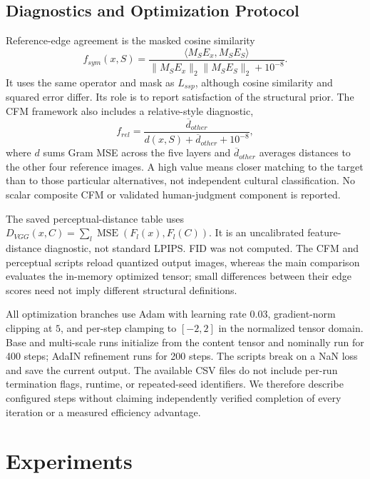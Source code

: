 \documentclass[manuscript,acmlarge,screen,review]{acmart}
\begin{document}
\subsection{Diagnostics and Optimization Protocol}
Reference-edge agreement is the masked cosine similarity
\begin{equation}
f_{sym}(x,S)=\frac{\langle M_SE_x,M_SE_S\rangle}{\|M_SE_x\|_2\|M_SE_S\|_2+10^{-8}}.
\end{equation}
It uses the same operator and mask as $L_{ssp}$, although cosine similarity and squared error differ. Its role is to report satisfaction of the structural prior. The CFM framework also includes a relative-style diagnostic,
\begin{equation}
f_{rel}=\frac{\overline d_{other}}{d(x,S)+\overline d_{other}+10^{-8}},
\end{equation}
where $d$ sums Gram MSE across the five layers and $\overline d_{other}$ averages distances to the other four reference images. A high value means closer matching to the target than to those particular alternatives, not independent cultural classification. No scalar composite CFM or validated human-judgment component is reported.

The saved perceptual-distance table uses $D_{VGG}(x,C)=\sum_l\operatorname{MSE}(F_l(x),F_l(C))$. It is an uncalibrated feature-distance diagnostic, not standard LPIPS. FID was not computed. The CFM and perceptual scripts reload quantized output images, whereas the main comparison evaluates the in-memory optimized tensor; small differences between their edge scores need not imply different structural definitions.

All optimization branches use Adam with learning rate $0.03$, gradient-norm clipping at $5$, and per-step clamping to $[-2,2]$ in the normalized tensor domain. Base and multi-scale runs initialize from the content tensor and nominally run for 400 steps; AdaIN refinement runs for 200 steps. The scripts break on a NaN loss and save the current output. The available CSV files do not include per-run termination flags, runtime, or repeated-seed identifiers. We therefore describe configured steps without claiming independently verified completion of every iteration or a measured efficiency advantage.

\section{Experiments}
\label{sec:experiments}
\end{document}
